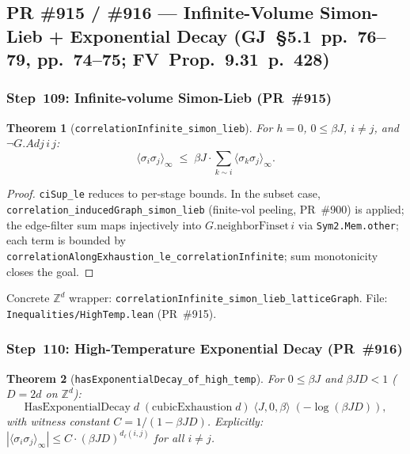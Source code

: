 \documentclass[a4paper,11pt]{article}
\newtheorem{theorem}{Theorem}
\begin{document}
\subsection*{PR \#915 / \#916 --- Infinite-Volume Simon-Lieb + Exponential Decay
(GJ~\S5.1~pp.~76--79, pp.~74--75; FV~Prop.~9.31~p.~428)}

\subsubsection*{Step~109: Infinite-volume Simon-Lieb (PR~\#915)}

\begin{theorem}[\texttt{correlationInfinite\_simon\_lieb}]
For $h=0$, $0\le\beta J$, $i\ne j$, and $\neg G.\mathit{Adj}\,i\,j$:
\[
  \langle\sigma_i\sigma_j\rangle_\infty
  \;\le\;
  \beta J\cdot\sum_{k\sim i}\langle\sigma_k\sigma_j\rangle_\infty.
\]
\end{theorem}

\begin{proof}
\texttt{ciSup\_le} reduces to per-stage bounds.
In the subset case, \texttt{correlation\_inducedGraph\_simon\_lieb}
(finite-vol peeling, PR~\#900) is applied; the edge-filter sum maps
injectively into $G.\mathrm{neighborFinset}\,i$ via \texttt{Sym2.Mem.other};
each term is bounded by \texttt{correlationAlongExhaustion\_le\_correlationInfinite};
sum monotonicity closes the goal.
\end{proof}

Concrete $\mathbb{Z}^d$ wrapper: \texttt{correlationInfinite\_simon\_lieb\_latticeGraph}.
File: \texttt{Inequalities/HighTemp.lean} (PR~\#915).

\subsubsection*{Step~110: High-Temperature Exponential Decay (PR~\#916)}

\begin{theorem}[\texttt{hasExponentialDecay\_of\_high\_temp}]
For $0\le\beta J$ and $\beta J D < 1$ ($D = 2d$ on $\mathbb{Z}^d$):
\[
  \mathrm{HasExponentialDecay}\;d\;(\mathrm{cubicExhaustion}\;d)\;
  \langle J,0,\beta\rangle\;(-\log(\beta J D)),
\]
with witness constant $C = 1/(1-\beta J D)$.
Explicitly: $|\langle\sigma_i\sigma_j\rangle_\infty|
  \le C\cdot(\beta J D)^{d_\ell(i,j)}$ for all $i\ne j$.
\end{theorem}
\end{document}
